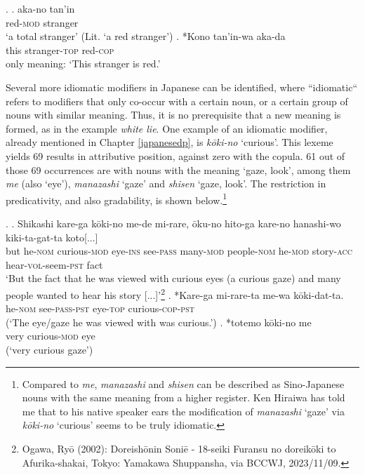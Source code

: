 \documentclass [output=book,colorlinks,citecolor=brown]{langscibook}
\begin{document}
\ex. \ag. aka-no tan'in\\
red-\textsc{mod} stranger\\
`a total stranger' (Lit. `a red stranger')
\bg. *Kono tan'in-wa aka-da\\
this stranger-\textsc{top} red-\textsc{cop}\\
only meaning: `This stranger is red.’

Several more idiomatic modifiers in Japanese can be identified, where ``idiomatic“ refers to modifiers that only co-occur with a certain noun, or a certain group of nouns with similar meaning. Thus, it is no prerequisite that a new meaning is formed, as in the example \textit{white lie}. One example of an idiomatic modifier, already mentioned in Chapter \ref{japanesedp}, is \textit{kōki-no} `curious’. This lexeme yields 69 results in attributive position, against zero with the copula. 61 out of those 69 occurrences are with nouns with the meaning `gaze, look’, among them \textit{me} (also `eye'), \textit{manazashi} `gaze' and \textit{shisen} `gaze, look'. The restriction in predicativity, and also gradability, is shown below.\footnote{Compared to \textit{me}, \textit{manazashi} and \textit{shisen} can be described as Sino-Japanese nouns with the same meaning from a higher register. Ken Hiraiwa has told me that to his native speaker ears the modification of \textit{manazashi} `gaze' via \textit{kōki-no} `curious’ seems to be truly idiomatic.} %

\newpage
\ex. \ag. Shikashi kare-ga kōki-no me-de mi-rare, ōku-no hito-ga kare-no hanashi-wo kiki-ta-gat-ta koto[...]\\
but he-\textsc{nom} curious-\textsc{mod} eye-\textsc{ins} see-\textsc{pass} many-\textsc{mod} people-\textsc{nom} he-\textsc{mod} story-\textsc{acc} hear-\textsc{vol}-seem-\textsc{pst} fact\\
`But the fact that he was viewed with curious eyes (a curious gaze) and many people wanted to hear his story [...]’\footnote{Ogawa, Ryō (2002): Doreishōnin Soniē - 18-seiki Furansu no doreikōki to Afurika-shakai, Tokyo: Yamakawa Shuppansha, via BCCWJ, 2023/11/09.}
\bg. *Kare-ga mi-rare-ta me-wa kōki-dat-ta.\\
he-\textsc{nom} see-\textsc{pass-pst} eye-\textsc{top} curious-\textsc{cop-pst}\\
(`The eye/gaze he was viewed with was curious.’)
\cg. *totemo kōki-no me\\
very curious-\textsc{mod} eye\\
(`very curious gaze’)
\end{document}

